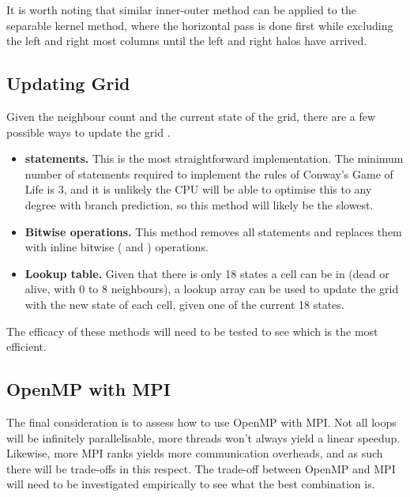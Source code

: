     It is worth noting that similar inner-outer method can be applied to the separable kernel method, where the horizontal
    pass is done first while excluding the left and right most columns until the left and right halos have arrived.

    \subsection{Updating Grid}\label{subsec:update-grid}
    Given the neighbour count and the current state of the grid, there are a few possible ways to update the grid \cite{branchless-programming}.
    \begin{itemize}
        \item \textbf{ statements.} This is the most straightforward implementation.
        The minimum number of  statements required to implement the rules of Conway's Game of Life is 3,
        and it is unlikely the CPU will be able to optimise this to any degree with branch prediction, so
        this method will likely be the slowest.
        \item \textbf{Bitwise operations.} This method removes all  statements and replaces them with
            inline bitwise (\inlinecode{&&} and \inlinecode{||}) operations.
        \item \textbf{Lookup table.} Given that there is only 18 states a cell can be in (dead or alive, with 0 to 8 neighbours),
            a lookup array can be used to update the grid with the new state of each cell, given one of the current
            18 states.
    \end{itemize}
    The efficacy of these methods will need to be tested to see which is the most efficient.

    \subsection{OpenMP with MPI}\label{subsec:omp-with-mpi}
    The final consideration is to assess how to use OpenMP with MPI.
    Not all loops will be infinitely parallelisable, more threads won't always yield a linear speedup.
    Likewise, more MPI ranks yields more communication overheads, and as such there will be trade-offs in this respect.
    The trade-off between OpenMP and MPI will need to be investigated empirically to see what the best combination is.



